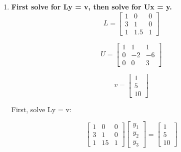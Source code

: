 \documentclass{article}
\begin{document}
\begin{enumerate}
Step 5: R1 = R1 + R3 and R2 = R2 - 2R3:

\[
\begin{bmatrix}
1 & 0 & 0 & | & 0.5 & -0.5 & 0.5 \\
0 & 1 & 0 & | & -4 & 3 & -1 \\
0 & 0 & 1 & | & 2.5 & -1.5 & 0.5
\end{bmatrix}
\]

\newpage
The right half of the augmented matrix is now the inverse of matrix A:

\[
A^{-1} = \begin{bmatrix}
 0.5 & -0.5 & 0.5 \\
-4 & 3 & -1 \\
2.5 & -1.5 & 0.5
\end{bmatrix}
\]


    \item \textbf{First solve for Ly = v, then solve for Ux = y.}
    \[
    L =
    \begin{bmatrix}
    1 & 0 & 0 \\
    3 & 1 & 0 \\
    1 & 1.5 & 1
    \end{bmatrix}
    \]
    
    \[
    U =
    \begin{bmatrix}
    1 & 1 & 1 \\
    0 & -2 & -6 \\
    0 & 0 & 3
    \end{bmatrix}
    \]
    
    \[
    v =
    \begin{bmatrix}
    1 \\
    5 \\
    10
    \end{bmatrix}
    \]
    
    First, solve Ly = v:
    
    \[
    \begin{bmatrix}
    1 & 0 & 0 \\
    3 & 1 & 0 \\
    1 & 15 & 1
    \end{bmatrix}
    \begin{bmatrix}
    y_1 \\
    y_2 \\
    y_3
    \end{bmatrix}
    =
    \begin{bmatrix}
    1 \\
    5 \\
    10
    \end{bmatrix}
    \]
    

\end{enumerate}
\end{document}
